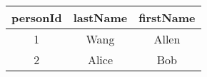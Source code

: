 \begin{tabular}{|c|c|c|}
    \hline
        \textbf{personId} & \textbf{lastName} & \textbf{firstName} \\ \hline
        1 & Wang & Allen \\ 
        2 & Alice & Bob \\ \hline
\end{tabular}
